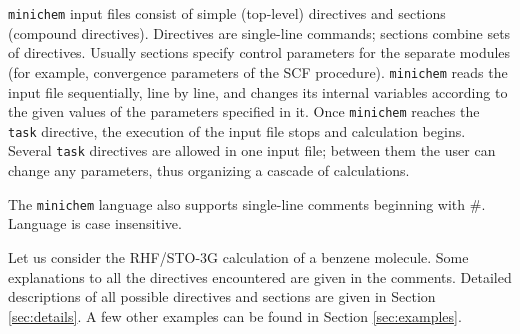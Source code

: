 \documentclass[a4paper, 12pt]{article}
\begin{document}
\texttt{minichem} input files consist of simple (top-level) directives and sections (compound directives). Directives are single-line commands; sections combine sets of directives. Usually sections specify control parameters for the separate modules (for example, convergence parameters of the SCF procedure). \texttt{minichem} reads the input file sequentially, line by line, and changes its internal variables according to the given values of the parameters specified in it. Once \texttt{minichem} reaches the \texttt{task} directive, the execution of the input file stops and calculation begins.
Several \texttt{task} directives are allowed in one input file; between them the user can change any parameters, thus organizing a cascade of calculations.

The \texttt{minichem} language also supports single-line comments beginning with \#. Language is case insensitive.

Let us consider the RHF/STO-3G calculation of a benzene molecule. Some explanations to all the directives encountered are given in the comments.
Detailed descriptions of all possible directives and sections are given in Section \ref{sec:details}. A few other examples can be found in Section \ref{sec:examples}.
\end{document}
